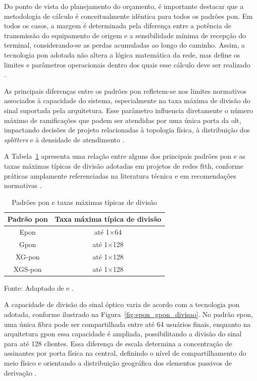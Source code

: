 Do ponto de vista do planejamento do orçamento, é importante destacar que a metodologia de cálculo é conceitualmente idêntica para todos os padrões \gls{pon}. Em todos os casos, a margem é determinada pela diferença entre a potência de transmissão do equipamento de origem e a sensibilidade mínima de recepção do terminal, considerando-se as perdas acumuladas ao longo do caminho. Assim, a tecnologia \gls{pon} adotada não altera a lógica matemática da rede, mas define os limites e parâmetros operacionais dentro dos quais esse cálculo deve ser realizado \cite{keiser2011pon,holight_optical_budget}.

As principais diferenças entre os padrões \gls{pon} refletem-se nos limites normativos associados à capacidade do sistema, especialmente na taxa máxima de divisão do sinal suportada pela arquitetura. Esse parâmetro influencia diretamente o número máximo de ramificações que podem ser atendidas por uma única porta da \gls{olt}, impactando decisões de projeto relacionadas à topologia física, à distribuição dos \textit{splitters} e à densidade de atendimento \cite{itutg9841,itu_optical_access_tutorial}.

A Tabela~\ref{tab:padroes_pon_divisao} apresenta uma relação entre alguns dos principais padrões \gls{pon} e as taxas máximas típicas de divisão adotadas em projetos de redes \gls{ftth}, conforme práticas amplamente referenciadas na literatura técnica e em recomendações normativas \cite{itutg9841,keiser2011pon,itu_optical_access_tutorial}.

\begin{table}[htb]
\centering
\caption{Padrões \gls{pon} e taxas máximas típicas de divisão}
\label{tab:padroes_pon_divisao}
\begin{tabular}{c c}
\hline
\textbf{Padrão \gls{pon}} & \textbf{Taxa máxima típica de divisão} \\
\hline
Epon      & até 1$\times$64 \\
Gpon      & até 1$\times$128 \\
XG-pon    & até 1$\times$128 \\
XGS-pon   & até 1$\times$128 \\
\hline
\end{tabular}
\par\footnotesize Fonte: Adaptado de \cite{itutg9841} e \cite{keiser2011pon}.
\end{table}

A capacidade de divisão do sinal óptico varia de acordo com a tecnologia \gls{pon} adotada, conforme ilustrado na Figura~\ref{fig:epon_gpon_divisao}. No padrão \gls{epon}, uma única fibra pode ser compartilhada entre até 64 usuários finais, enquanto na arquitetura \gls{gpon} essa capacidade é ampliada, possibilitando a divisão do sinal para até 128 clientes. Essa diferença de escala determina a concentração de assinantes por porta física na central, definindo o nível de compartilhamento do meio físico e orientando a distribuição geográfica dos elementos passivos de derivação \cite{itutg9841,itu_optical_access_tutorial}.

